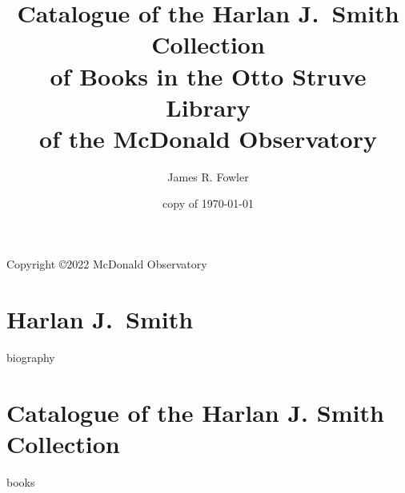 \documentclass{article}%
\begin{document}
\title{Catalogue of the Harlan J.~Smith Collection \\
  of Books in the Otto Struve Library \\
  of the McDonald Observatory}
\author{James R. Fowler}
\date{copy of \today}
\maketitle

\vspace*{5 in}
\centerline{Copyright \copyright 2022 McDonald Observatory}

\section*{Harlan J.~Smith}
{biography}

\newpage

\section*{Catalogue of the Harlan J. Smith Collection}

{books}
\end{document}
